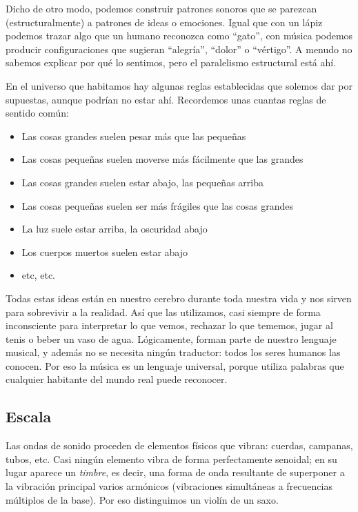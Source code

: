 \documentclass[]{report}
\providecommand{\tightlist}{%
  \setlength{\itemsep}{0pt}
  \setlength{\parskip}{0pt}
}
\begin{document}
Dicho de otro modo, podemos construir patrones sonoros que se parezcan (estructuralmente) a patrones de ideas o emociones. Igual que con un lápiz podemos trazar algo que un humano reconozca como ``gato'', con música podemos producir configuraciones que sugieran ``alegría'', ``dolor'' o ``vértigo''. A menudo no sabemos explicar por qué lo sentimos, pero el paralelismo estructural está ahí.

En el universo que habitamos hay algunas reglas establecidas que solemos dar por supuestas, aunque podrían no estar ahí. Recordemos unas cuantas reglas de sentido común:

\begin{itemize}
	\tightlist%
	\item Las cosas grandes suelen pesar más que las pequeñas
	\item Las cosas pequeñas suelen moverse más fácilmente que las grandes
	\item Las cosas grandes suelen estar abajo, las pequeñas arriba
	\item Las cosas pequeñas suelen ser más frágiles que las cosas grandes
	\item La luz suele estar arriba, la oscuridad abajo
	\item Los cuerpos muertos suelen estar abajo
	\item etc, etc.
\end{itemize}

Todas estas ideas están en nuestro cerebro durante toda nuestra vida y nos sirven para sobrevivir a la realidad. Así que las utilizamos, casi siempre de forma inconsciente para interpretar lo que vemos, rechazar lo que tememos, jugar al tenis o beber un vaso de agua. Lógicamente, forman parte de nuestro lenguaje musical, y además no se necesita ningún traductor: todos los seres humanos las conocen. Por eso la música es un lenguaje universal, porque utiliza palabras que cualquier habitante del mundo real puede reconocer.

\subsection{Escala}

Las ondas de sonido proceden de elementos físicos que vibran: cuerdas, campanas, tubos, etc. Casi ningún elemento vibra de forma perfectamente senoidal; en su lugar aparece un \emph{timbre}, es decir, una forma de onda resultante de superponer a la vibración principal varios armónicos (vibraciones simultáneas a frecuencias múltiplos de la base). Por eso distinguimos un violín de un saxo.
\end{document}
